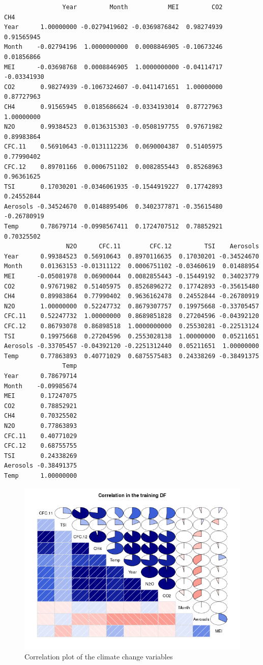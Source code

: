 \documentclass[letterpaper, 9pt, onecolumn, twoside, technote, final]{IEEEtran}
\begin{document}
\begin{verbatim}
                Year         Month           MEI         CO2         CH4
Year      1.00000000 -0.0279419602 -0.0369876842  0.98274939  0.91565945
Month    -0.02794196  1.0000000000  0.0008846905 -0.10673246  0.01856866
MEI      -0.03698768  0.0008846905  1.0000000000 -0.04114717 -0.03341930
CO2       0.98274939 -0.1067324607 -0.0411471651  1.00000000  0.87727963
CH4       0.91565945  0.0185686624 -0.0334193014  0.87727963  1.00000000
N2O       0.99384523  0.0136315303 -0.0508197755  0.97671982  0.89983864
CFC.11    0.56910643 -0.0131112236  0.0690004387  0.51405975  0.77990402
CFC.12    0.89701166  0.0006751102  0.0082855443  0.85268963  0.96361625
TSI       0.17030201 -0.0346061935 -0.1544919227  0.17742893  0.24552844
Aerosols -0.34524670  0.0148895406  0.3402377871 -0.35615480 -0.26780919
Temp      0.78679714 -0.0998567411  0.1724707512  0.78852921  0.70325502
                 N2O      CFC.11        CFC.12         TSI    Aerosols
Year      0.99384523  0.56910643  0.8970116635  0.17030201 -0.34524670
Month     0.01363153 -0.01311122  0.0006751102 -0.03460619  0.01488954
MEI      -0.05081978  0.06900044  0.0082855443 -0.15449192  0.34023779
CO2       0.97671982  0.51405975  0.8526896272  0.17742893 -0.35615480
CH4       0.89983864  0.77990402  0.9636162478  0.24552844 -0.26780919
N2O       1.00000000  0.52247732  0.8679307757  0.19975668 -0.33705457
CFC.11    0.52247732  1.00000000  0.8689851828  0.27204596 -0.04392120
CFC.12    0.86793078  0.86898518  1.0000000000  0.25530281 -0.22513124
TSI       0.19975668  0.27204596  0.2553028138  1.00000000  0.05211651
Aerosols -0.33705457 -0.04392120 -0.2251312440  0.05211651  1.00000000
Temp      0.77863893  0.40771029  0.6875575483  0.24338269 -0.38491375
                Temp
Year      0.78679714
Month    -0.09985674
MEI       0.17247075
CO2       0.78852921
CH4       0.70325502
N2O       0.77863893
CFC.11    0.40771029
CFC.12    0.68755755
TSI       0.24338269
Aerosols -0.38491375
Temp      1.00000000
\end{verbatim}

\begin{figure}[htb]
\centering
\includegraphics[width=.9\linewidth]{../graphs/climateChangeVarCorr.png}
\caption{\label{fig:climateChangeVarCorr}Correlation plot of the climate change variables}
\end{figure}
\end{document}
